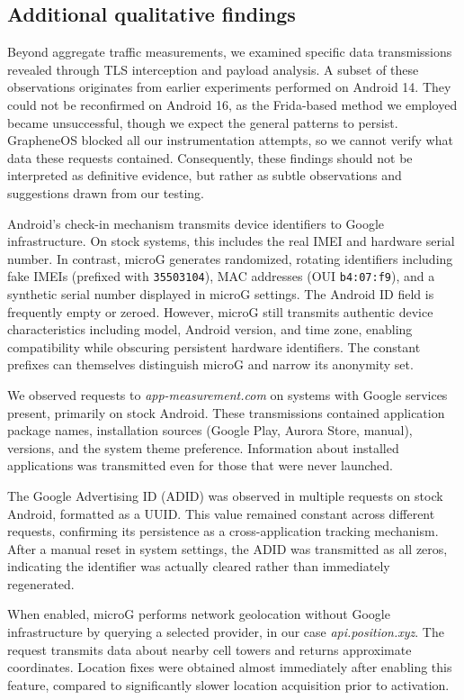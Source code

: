 \subsection{Additional qualitative findings}

Beyond aggregate traffic measurements, we examined specific data transmissions revealed through TLS interception and payload analysis. A subset of these observations originates from earlier experiments performed on Android 14. They could not be reconfirmed on Android 16, as the Frida-based method we employed became unsuccessful, though we expect the general patterns to persist. GrapheneOS blocked all our instrumentation attempts, so we cannot verify what data these requests contained. Consequently, these findings should not be interpreted as definitive evidence, but rather as subtle observations and suggestions drawn from our testing.

Android's check-in mechanism transmits device identifiers to Google infrastructure. On stock systems, this includes the real IMEI and hardware serial number. In contrast, microG generates randomized, rotating identifiers including fake IMEIs (prefixed with \texttt{35503104}), MAC addresses (OUI \texttt{b4:07:f9}), and a synthetic serial number displayed in microG settings. The Android ID field is frequently empty or zeroed. However, microG still transmits authentic device characteristics including model, Android version, and time zone, enabling compatibility while obscuring persistent hardware identifiers. The constant prefixes can themselves distinguish microG and narrow its anonymity set.

We observed requests to \textit{app-measurement.com} on systems with Google services present, primarily on stock Android. These transmissions contained application package names, installation sources (Google Play, Aurora Store, manual), versions, and the system theme preference. Information about installed applications was transmitted even for those that were never launched.

The Google Advertising ID (ADID) was observed in multiple requests on stock Android, formatted as a UUID. This value remained constant across different requests, confirming its persistence as a cross-application tracking mechanism. After a manual reset in system settings, the ADID was transmitted as all zeros, indicating the identifier was actually cleared rather than immediately regenerated.

When enabled, microG performs network geolocation without Google infrastructure by querying a selected provider, in our case \textit{api.position.xyz}. The request transmits data about nearby cell towers and returns approximate coordinates. Location fixes were obtained almost immediately after enabling this feature, compared to significantly slower location acquisition prior to activation.

